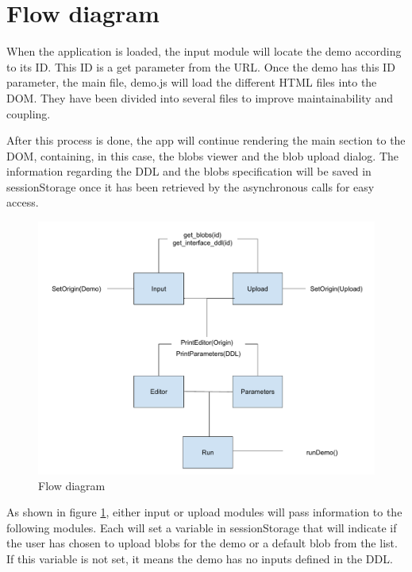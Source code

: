 
\section{Flow diagram}
When the application is loaded, the input module will locate the demo according to its ID. This ID is a get parameter from the URL.
Once the demo has this ID parameter, the main file, demo.js will load the different HTML files into the DOM. They have been divided 
into several files to improve maintainability and coupling.

After this process is done, the app will continue rendering the main section to the DOM, containing, in this case, the blobs viewer and 
the blob upload dialog. The information regarding the DDL and the blobs specification will be saved in sessionStorage once it has been retrieved by the asynchronous calls for easy access.

\begin{figure}[h]
	\centering
	\includegraphics[width=\textwidth]{images/flow}
	\caption{Flow diagram} 
	\label{fig:flow_diagram}
\end{figure} 


As shown in figure  \ref{fig:flow_diagram}, either input or upload modules will pass 
information to the following modules. Each will set a variable in sessionStorage that will indicate if the user has chosen to 
upload blobs for the demo or a default blob from the list. If this variable is not set, it means the demo has no inputs defined 
in the DDL.

